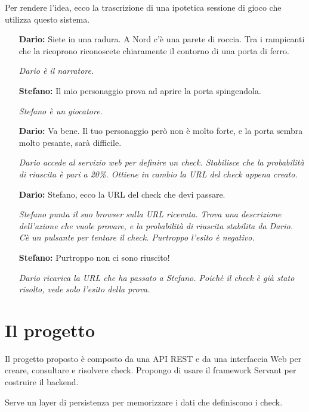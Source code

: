 \documentclass[a4paper]{article}
\begin{document}
Per rendere l'idea, ecco la trascrizione di una ipotetica sessione di
gioco che utilizza questo sistema.

\begin{enumerate}[leftmargin=3.5cm]
\item [\textbf{Dario:}] Siete in una radura. A Nord c'\`e una parete di
  roccia. Tra i rampicanti che la ricoprono riconoscete chiaramente il
  contorno di una porta di ferro.
  
  \textit{Dario \`e il narratore.}
  
\item [\textbf{Stefano:}] Il mio personaggio prova ad aprire la porta spingendola.

  \textit{Stefano \`e un giocatore.}

\item [\textbf{Dario:}] Va bene. Il tuo personaggio per\`o non \`e
  molto forte, e la porta sembra molto pesante, sar\`a difficile.

  \textit{Dario accede al servizio web per definire un
    check. Stabilisce che la probabilit\`a di riuscita \`e pari a
    20\%. Ottiene in cambio la URL del check appena creato.}

\item [\textbf{Dario:}] Stefano, ecco la URL del check che devi passare.

  \textit{Stefano punta il suo browser sulla URL ricevuta. Trova una
    descrizione dell'azione che vuole provare, e la probabilit\`a di
    riuscita stabilita da Dario. C\`e un pulsante per tentare il
    check. Purtroppo l'esito \`e negativo.}

\item [\textbf{Stefano:}] Purtroppo non ci sono riuscito!

  \textit{Dario ricarica la URL che ha passato a Stefano. Poich\`e il
    check \`e gi\`a stato risolto, vede solo l'esito della prova.}

\end{enumerate}

\section{Il progetto}

Il progetto proposto \`e composto da una API REST e da una interfaccia
Web per creare, consultare e risolvere check. Propongo di usare il
framework Servant per costruire il backend.

Serve un layer di persistenza per memorizzare i dati che definiscono i
check.
\end{document}
